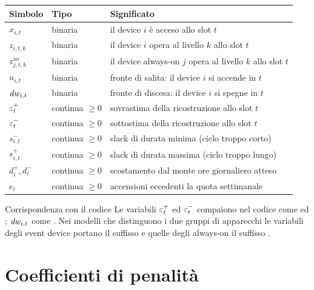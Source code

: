 \begin{center}
\begin{tabularx}{\textwidth}{@{}l l X@{}}
\toprule
\textbf{Simbolo} & \textbf{Tipo} & \textbf{Significato} \\
\midrule
$x_{i,t}$        & binaria    & il device $i$ è acceso allo slot $t$ \\
$z_{i,t,k}$      & binaria    & il device $i$ opera al livello $k$ allo slot $t$ \\
$z^{\text{ao}}_{j,t,k}$ & binaria & il device always-on $j$ opera al livello $k$ allo slot $t$ \\
$u_{i,t}$        & binaria    & fronte di salita: il device $i$ si accende in $t$ \\
$\mathit{dw}_{i,t}$      & binaria    & fronte di discesa: il device $i$ si spegne in $t$ \\
$\varepsilon^{+}_t$          & continua $\ge 0$ & sovrastima della ricostruzione allo slot $t$ \\
$\varepsilon^{-}_t$          & continua $\ge 0$ & sottostima della ricostruzione allo slot $t$ \\
$s^{-}_{i,t}$    & continua $\ge 0$ & slack di durata minima (ciclo troppo corto) \\
$s^{+}_{i,t}$    & continua $\ge 0$ & slack di durata massima (ciclo troppo lungo) \\
$d^{+}_i, d^{-}_i$ & continua $\ge 0$ & scostamento dal monte ore giornaliero atteso \\
$e_i$            & continua $\ge 0$ & accensioni eccedenti la quota settimanale \\
\bottomrule
\end{tabularx}
\end{center}

\begin{notebox}{Corrispondenza con il codice}
Le variabili $\varepsilon^{+}_t$ ed $\varepsilon^{-}_t$ compaiono nel codice come  ed ; $\mathit{dw}_{i,t}$ come
. Nei modelli che distinguono i due gruppi di apparecchi le variabili degli event device
portano il suffisso  e quelle degli always-on il suffisso .
\end{notebox}

\section{Coefficienti di penalità}

